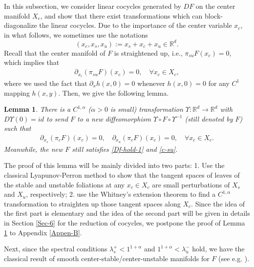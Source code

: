 \documentclass[reqno]{amsart}
\numberwithin{equation}{section}
\newtheorem{lemma}[theorem]{Lemma}
\begin{document}
In this subsection, we consider linear cocycles generated by $DF$ on the center manifold $X_c$, and show that there exist transformations which can block-diagonalize the linear cocycles.
Due to the importance of the center variable $x_c$, in what follows, we sometimes use the notations
$$
(x_c,x_s,x_u):=x_s+x_c+x_u\in \mathbb{R}^d.  %
$$
Recall that the center manifold of $F$ is straightened up, i.e.,
$\pi_{su}F(x_c)=0$,
which implies that
\begin{align}\label{c-su}
\partial_{x_{c}}(\pi_{su}F)(x_c)=0,\quad \forall x_c\in X_c,
\end{align}
where we used the fact that $\partial_x h(x,0)=0$ whenever $h(x,0)=0$ for any $C^1$ mapping $h(x,y)$. Then, we give the following lemma.
\begin{lemma}\label{lm-diagC}
There is a $C^{1,\alpha}$ {\rm (}$\alpha>0$ is small{\rm )} transformation $\Upsilon:\mathbb{R}^d\to \mathbb{R}^d$ with $D\Upsilon(0)=id$ to send $F$ to a new diffeomorphism $\Upsilon\circ F\circ \Upsilon^{-1}$ {\rm (}still denoted by $F${\rm )} such that 
\begin{align}\label{CC0}
\partial_{x_{s}}(\pi_c F)(x_c)=0, \quad \partial_{x_u}(\pi_c F)(x_c)=0, \quad \forall x_c\in X_c.
\end{align}
Meanwhile, the new $F$ still satisfies \eqref{Df-hold-1} and \eqref{c-su}.
\end{lemma}
\noindent The proof of this lemma will be mainly divided into two parts: 1. Use the classical Lyapunov-Perron method to show that the tangent spaces of leaves of the stable and unstable foliations at any $x_c\in X_c$ are small perturbations of $X_s$ and $X_u$, respectively; 2. use the Whitney's extension theorem to find a $C^{1,\alpha}$ transformation to straighten up those tangent spaces
along $X_c$. Since the idea of the first part is elementary and the idea of the second part will be given in details in Section \ref{Sec-6} for the reduction of cocycles, we postpone the proof of Lemma \ref{lm-diagC} to Appendix \ref{Appen-B}. 


Next, since the spectral conditions
 $\lambda_s^+<1^{1+\alpha}$  and $1^{1+\alpha} < \lambda_u^-$ hold, we have the classical result of smooth center-stable/center-unstable manifolds for $F$ (see e.g. \cite[Theorem 4.1]{HPS-Book}).
\end{document}
